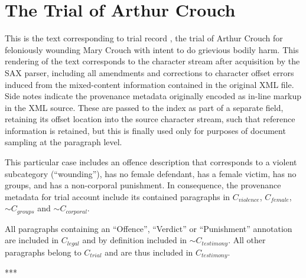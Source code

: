\chapter{The Trial of Arthur Crouch}
\label{app:crouch}

This is the text corresponding to trial record , the trial of Arthur Crouch for feloniously wounding Mary Crouch with intent to do grievious bodily harm.
This rendering of the text corresponds to the character stream after acquisition by the SAX parser, including all amendments and corrections to character offset errors induced from the mixed-content information contained in the original XML file.
Side notes indicate the provenance metadata originally encoded as in-line markup in the XML source.
These are passed to the index as part of a separate field, retaining its offset location into the source character stream, such that reference information is retained, but this is finally used only for purposes of document sampling at the paragraph level.

This particular case includes an offence description that corresponds to a violent subcategory (``wounding''), has no female defendant, has a female victim, has no groups, and has a non-corporal punishment.
In consequence, the provenance metadata for trial account  include its contained paragraphs in $C_{violence}$, $C_{female}$, $\sim C_{groups}$ and $\sim C_{corporal}$.

All paragraphs containing an ``Offence'', ``Verdict'' or ``Punishment'' annotation are included in $C_{legal}$ and by definition included in $\sim C_{testimony}$.
All other paragraphs belong to $C_{trial}$ and are thus included in $C_{testimony}$.

\begin{center}
    ***
\end{center}


